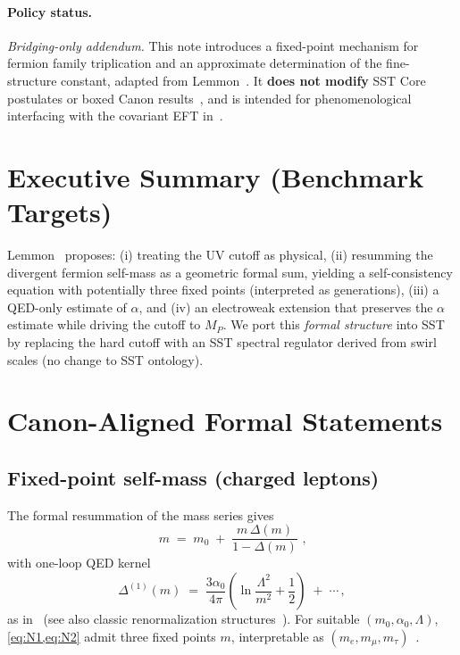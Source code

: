 \documentclass[11pt]{article}
\begin{document}
      \paragraph{Policy status.}
          \emph{Bridging-only addendum.} This note introduces a fixed-point mechanism for fermion family triplication and an approximate determination of the fine-structure constant, adapted from Lemmon~\cite{Lemmon2013FamiliesAlpha}. It \textbf{does not modify} SST Core postulates or boxed Canon results~\cite{SSTCanon2025}, and is intended for phenomenological interfacing with the covariant EFT in~\cite{SSTLagrangian2025}.

      \section{Executive Summary (Benchmark Targets)}
      Lemmon~\cite{Lemmon2013FamiliesAlpha} proposes: (i) treating the UV cutoff as physical, (ii) resumming the divergent fermion self-mass as a geometric formal sum, yielding a self-consistency equation with potentially three fixed points (interpreted as generations), (iii) a QED-only estimate of $\alpha$, and (iv) an electroweak extension that preserves the $\alpha$ estimate while driving the cutoff to $M_P$. We port this \emph{formal structure} into SST by replacing the hard cutoff with an SST spectral regulator derived from swirl scales (no change to SST ontology).

      \section{Canon-Aligned Formal Statements}
      \subsection{Fixed-point self-mass (charged leptons)}
          The formal resummation of the mass series gives
          \begin{equation}
          \boxed{\, m \;=\; m_0 \;+\; \frac{m\,\Delta(m)}{1-\Delta(m)} \,}\,,
          \label{eq:N1}
          \end{equation}
          with one-loop QED kernel
          \begin{equation}
          \Delta^{(1)}(m)\;=\;\frac{3\alpha_0}{4\pi}\!\left(\ln\!\frac{\Lambda^2}{m^2}+\frac12\right)\;+\;\cdots\,,
          \label{eq:N2}
          \end{equation}
          as in~\cite{Lemmon2013FamiliesAlpha} (see also classic renormalization structures~\cite{Feynman1949SelfEnergy,PauliVillars1949}). For suitable $(m_0,\alpha_0,\Lambda)$, \cref{eq:N1,eq:N2} admit three fixed points $m$, interpretable as $(m_e,m_\mu,m_\tau)$~\cite{Lemmon2013FamiliesAlpha}.
\end{document}
